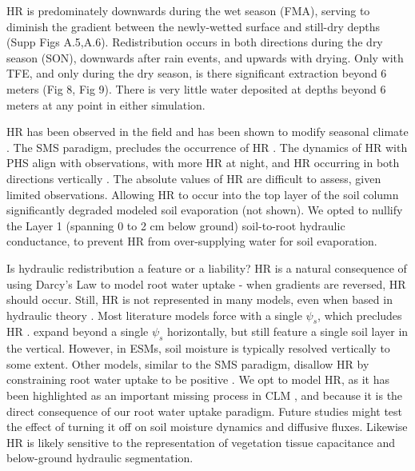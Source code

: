 \documentclass[draft,linenumbers]{agujournal}
\begin{document}
HR is predominately downwards during the wet season (FMA), serving to diminish the gradient between the newly-wetted surface and still-dry depths (Supp Figs A.5,A.6).
Redistribution occurs in both directions during the dry season (SON), downwards after rain events, and upwards with drying.
Only with TFE, and only during the dry season, is there significant extraction beyond 6 meters (Fig 8, Fig 9).
There is very little water deposited at depths beyond 6 meters at any point in either simulation.

HR has been observed in the field \citep{oliveira2005} and has been shown to modify seasonal climate \citep{lee2005}.
The SMS paradigm, precludes the occurrence of HR \citep{oleson2013}.
The dynamics of HR with PHS align with observations, with more HR at night, and HR occurring in both directions vertically \citep{burgess1998}.
The absolute values of HR are difficult to assess, given limited observations.
Allowing HR to occur into the top layer of the soil column significantly degraded modeled soil evaporation (not shown).
We opted to nullify the Layer 1 (spanning 0 to 2 cm below ground) soil-to-root hydraulic conductance, to prevent HR from over-supplying water for soil evaporation.

Is hydraulic redistribution a feature or a liability?
HR is a natural consequence of using Darcy's Law to model root water uptake - when gradients are reversed, HR should occur.
Still, HR is not represented in many models, even when based in hydraulic theory \citep{xu2016,christoffersen2016}.
Most literature models force with a single $\psi_s$, which precludes HR \citep{fisher2007,bonan2014,sperry2017}.
\cite{christoffersen2016} expand beyond a single $\psi_s$ horizontally, but still feature a single soil layer in the vertical.
However, in ESMs, soil moisture is typically resolved vertically to some extent.
Other models, similar to the SMS paradigm, disallow HR by constraining root water uptake to be positive \citep{xu2016}.
We opt to model HR, as it has been highlighted as an important missing process in CLM \citep{lee2005}, 
and because it is the direct consequence of our root water uptake paradigm.
Future studies might test the effect of turning it off on soil moisture dynamics and diffusive fluxes.
Likewise HR is likely sensitive to the representation of vegetation tissue capacitance and below-ground hydraulic segmentation.
\end{document}
